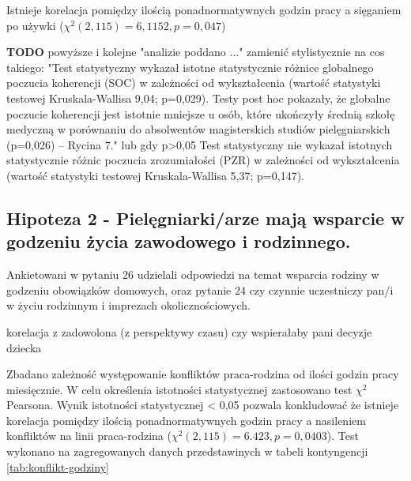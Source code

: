 \documentclass[a4paper,12pt,twoside,openany]{report}
\newcommand{\TODO}{\textbf{TODO}}
\begin{document}
Istnieje korelacja pomiędzy ilością ponadnormatywnych godzin pracy a sięganiem po używki ($\chi^2 (2, 115) = 6,1152, p=0,047$)
   
\vspace{\baselineskip} 
\TODO
\newline
powyższe  i kolejne  "analizie poddano ..." zamienić stylistycznie na cos takiego: \newline
"Test statystyczny wykazał istotne statystycznie różnice globalnego poczucia koherencji (SOC) w zależności od wykształcenia (wartość statystyki testowej Kruskala-Wallisa 9,04; p=0,029). Testy post hoc pokazały, że globalne poczucie koherencji jest istotnie mniejsze u osób, które ukończyły średnią szkołę medyczną w porównaniu do absolwentów magisterskich studiów pielęgniarskich (p=0,026) – Rycina 7." \newline
lub gdy p>0,05
\newline
Test statystyczny nie wykazał istotnych statystycznie różnic poczucia zrozumiałości (PZR) w zależności od wykształcenia (wartość statystyki testowej Kruskala-Wallisa 5,37; p=0,147).

   
   

\subsection*{Hipoteza 2 - Pielęgniarki/arze mają wsparcie w godzeniu życia zawodowego i rodzinnego.}

Ankietowani  w pytaniu 26 udzielali odpowiedzi na temat wsparcia rodziny w godzeniu obowiązków domowych, oraz  pytanie 24 czy czynnie uczestniczy pan/i w życiu rodzinnym i imprezach okolicznościowych.

korelacja z
zadowolona (z perspektywy czasu)
czy wspierałaby pani decyzje dziecka
    

\vspace{\baselineskip} 
  



\vspace{\baselineskip} 
    
Zbadano zależność  występowanie konfliktów praca-rodzina od ilości godzin pracy miesięcznie.
W celu określenia istotności statystycznej zastosowano test $\chi^2$ Pearsona.  
Wynik istotności statystycznej < 0,05 pozwala konkludować że istnieje korelacja pomiędzy ilością ponadnormatywnych godzin pracy a nasileniem konfliktów na linii praca-rodzina ($\chi^2 (2, 115) = 6.423, p=0,0403$).
Test wykonano na zagregowanych danych przedstawinych w tabeli kontyngencji \ref{tab:konflikt-godziny}
\end{document}
